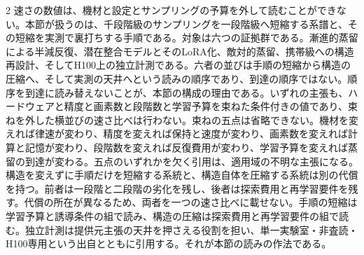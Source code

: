 \documentclass[lualatex,a4paper,10pt]{jlreq}
\begin{document}
\begin{multicols}{2}
\raggedcolumns
速さの数値は、機材と設定とサンプリングの予算を外して読むことができない。本節が扱うのは、千段階級のサンプリングを一段階級へ短縮する系譜と、その短縮を実測で裏打ちする手順である。対象は六つの証拠群である。漸進的蒸留による半減反復、潜在整合モデルとそのLoRA化、敵対的蒸留、携帯級への構造再設計、そしてH100上の独立計測である\autocite{btd078,btd079,btd080,btd081,btd082,btd137}。六者の並びは手順の短縮から構造の圧縮へ、そして実測の天井へという読みの順序であり、到達の順序ではない。順序を到達に読み替えないことが、本節の構成の理由である。いずれの主張も、ハードウェアと精度と画素数と段階数と学習予算を束ねた条件付きの値であり、束ねを外した横並びの速さ比べは行わない\autocite{btd078,btd081,btd082,btd137}。束ねの五点は省略できない。機材を変えれば律速が変わり、精度を変えれば保持と速度が変わり、画素数を変えれば計算と記憶が変わり、段階数を変えれば反復費用が変わり、学習予算を変えれば蒸留の到達が変わる。五点のいずれかを欠く引用は、適用域の不明な主張になる。構造を変えずに手順だけを短縮する系統と、構造自体を圧縮する系統は別の代償を持つ。前者は一段階と二段階の劣化を残し、後者は探索費用と再学習要件を残す\autocite{btd078,btd082}。代償の所在が異なるため、両者を一つの速さ比べに載せない。手順の短縮は学習予算と誘導条件の組で読み、構造の圧縮は探索費用と再学習要件の組で読む。独立計測は提供元主張の天井を押さえる役割を担い、単一実験室・非査読・H100専用という出自とともに引用する。それが本節の読みの作法である\autocite{btd078,btd137}。


\end{multicols}
\end{document}
